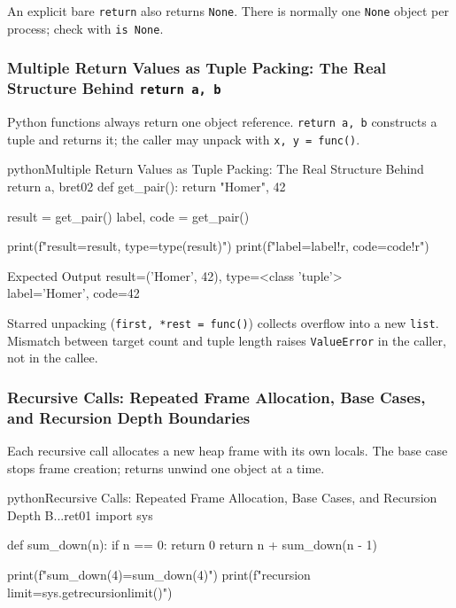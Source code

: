 \documentclass[a4paper,twoside]{report}
\begin{document}
An explicit bare \texttt{return} also returns \texttt{None}. There is normally one \texttt{None} object per process; check with \texttt{is None}.

\subsubsection{Multiple Return Values as Tuple Packing: The Real Structure Behind \texttt{return a, b}}

Python functions always return one object reference. \texttt{return a, b} constructs a tuple and returns it; the caller may unpack with \texttt{x, y = func()}.

\begin{codebox}[]{python}{Multiple Return Values as Tuple Packing: The Real Structure Behind return a, b}{ret02}
def get_pair():
    return "Homer", 42

result = get_pair()
label, code = get_pair()

print(f"result={result}, type={type(result)}")
print(f"label={label!r}, code={code!r}")
\end{codebox}


\begin{iobox}{Expected Output}
result=('Homer', 42), type=<class 'tuple'> \\
label='Homer', code=42 \\
\end{iobox}




Starred unpacking (\texttt{first, *rest = func()}) collects overflow into a new \texttt{list}. Mismatch between target count and tuple length raises \texttt{ValueError} in the caller, not in the callee.

\subsubsection{Recursive Calls: Repeated Frame Allocation, Base Cases, and Recursion Depth Boundaries}

Each recursive call allocates a new heap frame with its own locals. The base case stops frame creation; returns unwind one object at a time.

\begin{codebox}[]{python}{Recursive Calls: Repeated Frame Allocation, Base Cases, and Recursion Depth B...}{ret01}
import sys

def sum_down(n):
    if n == 0:
        return 0
    return n + sum_down(n - 1)

print(f"sum_down(4)={sum_down(4)}")
print(f"recursion limit={sys.getrecursionlimit()}")
\end{codebox}
\end{document}
